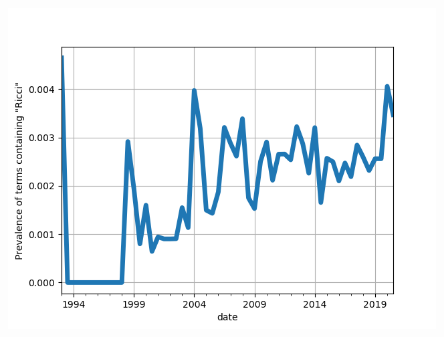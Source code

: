 \documentclass[10pt, handout]{beamer}
\begin{document}
\begin{frame}
\begin{columns}
\begin{column}{0.6\textwidth}
\begin{center}
                \includegraphics[width=0.85\textwidth]{../Images/ricci_preval.png}
            \end{center}
        \end{column}
    \end{columns}
\end{frame}

\end{document}
